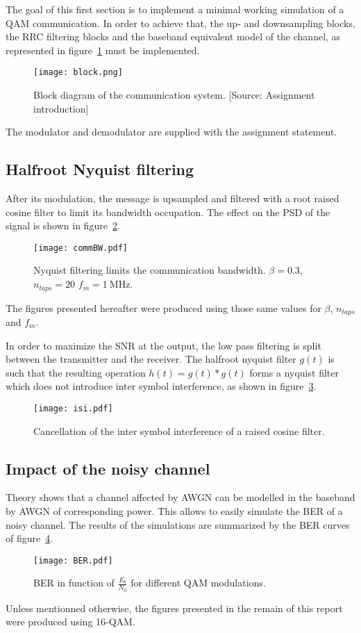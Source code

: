 The goal of this first section is to implement a minimal working simulation of a QAM communication.
In order to achieve that, the up- and downsampling blocks, the RRC filtering blocks and the baseband equivalent model of the channel, as represented in figure~\ref{fig:chain} must be implemented.
\begin{figure}[htbp]
\centering
\texttt{[image: block.png]}
\caption[Block diagram of the communication system.]{Block diagram of the communication system. [Source: Assignment introduction]\label{fig:chain}}
\end{figure}
The modulator and demodulator are supplied with the assignment statement.

\subsection{Halfroot Nyquist filtering}
After its modulation, the message is upsampled and filtered with a root raised cosine filter to limit its bandwidth occupation.
The effect on the PSD of the signal is shown in figure~\ref{fig:LPF}.
\begin{figure}[htbp]
\centering
\texttt{[image: commBW.pdf]}
\caption[Nyquist filtering limits the communication bandwidth.]{Nyquist filtering limits the communication bandwidth. $\beta = 0.3$, $n_{taps} = 20$ $f_m = \SI{1}{\mega\hertz}.$ \label{fig:LPF}}
\end{figure}
The figures presented hereafter were produced using those same values for $\beta$, $n_{taps}$ and $f_m$.

In order to maximize the SNR at the output, the low pass filtering is split between the transmitter and the receiver.
The halfroot nyquist filter $g(t)$ is such that the resulting operation $h(t) = g(t)*g(t)$ forms a nyquist filter which does not introduce inter symbol interference, as shown in figure~\ref{fig:noISI}.
\begin{figure}
\centering
\texttt{[image: isi.pdf]}
\caption{Cancellation of the inter symbol interference of a raised cosine filter.\label{fig:noISI}}
\end{figure}

\subsection{Impact of the noisy channel}
Theory shows that a channel affected by AWGN can be modelled in the baseband by AWGN of corresponding power.
This allows to easily simulate the BER of a noisy channel.
The results of the simulations are summarized by the BER curves of figure~\ref{fig:BER}.
\begin{figure}[htbp]
\texttt{[image: BER.pdf]}
\caption{BER in function of $\frac{E_b}{N_0}$ for different QAM modulations.\label{fig:BER}}
\end{figure}
Unless mentionned otherwise, the figures presented in the remain of this report were produced using 16-QAM.

